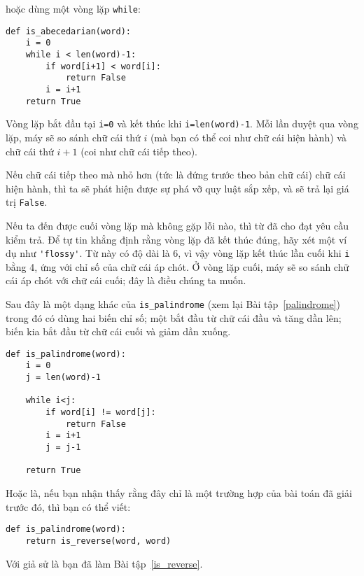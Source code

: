 \documentclass[11pt]{book}
\begin{document}
hoặc dùng một vòng lặp {\tt while}:

\beforeverb
\begin{verbatim}
def is_abecedarian(word):
    i = 0
    while i < len(word)-1:
        if word[i+1] < word[i]:
            return False
        i = i+1
    return True
\end{verbatim}
\afterverb
%
Vòng lặp bắt đầu tại {\tt i=0} và kết thúc khi {\tt i=len(word)-1}.  
Mỗi lần duyệt qua vòng lặp, máy sẽ so sánh chữ cái thứ $i$ (mà bạn có
thể coi như chữ cái hiện hành) và chữ cái thứ $i+1$ (coi như chữ cái
tiếp theo).

Nếu chữ cái tiếp theo mà nhỏ hơn (tức là đứng trước theo bản chữ cái) 
chữ cái hiện hành, thì ta sẽ phát hiện được sự phá vỡ quy luật sắp xếp,
và sẽ trả lại giá trị {\tt False}.

Nếu ta đến được cuối vòng lặp mà không gặp lỗi nào, thì từ đã cho 
đạt yêu cầu kiểm trả. Để tự tin khẳng định rằng vòng lặp đã kết thúc đúng,
hãy xét một ví dụ như \verb"'flossy'".  Từ này có độ dài là 6, vì vậy
vòng lặp kết thúc lần cuối khi {\tt i} bằng 4, ứng với chỉ số của chữ cái
áp chót. Ở vòng lặp cuối, máy sẽ so sánh chữ cái áp chót với chữ cái cuối;
đây là điều chúng ta muốn.


Sau đây là một dạng khác của \verb"is_palindrome" (xem lại
Bài tập~\ref{palindrome}) trong đó có dùng hai biến chỉ số; một bắt đầu từ
chữ cái đầu và tăng dần lên; biến kia bắt đầu từ chữ cái cuối và giảm dần xuống.

\beforeverb
\begin{verbatim}
def is_palindrome(word):
    i = 0
    j = len(word)-1

    while i<j:
        if word[i] != word[j]:
            return False
        i = i+1
        j = j-1

    return True
\end{verbatim}
\afterverb

Hoặc là, nếu bạn nhận thấy rằng đây chỉ là một trường hợp của bài toán
đã giải trước đó, thì bạn có thể viết:

\beforeverb
\begin{verbatim}
def is_palindrome(word):
    return is_reverse(word, word)
\end{verbatim}
\afterverb


Với giả sử là bạn đã làm Bài tập~\ref{is_reverse}.
\end{document}
